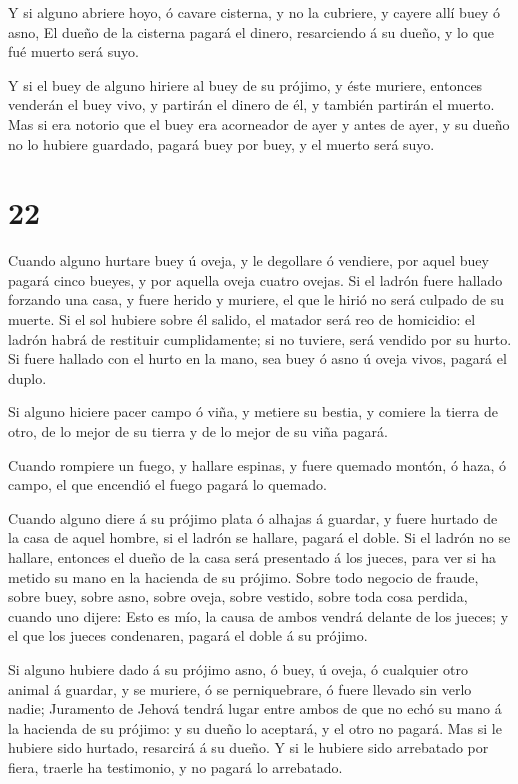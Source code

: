  Y si alguno abriere hoyo, ó cavare cisterna, y no la
cubriere, y cayere allí buey ó asno,  El dueño de la
cisterna pagará el dinero, resarciendo á su dueño, y lo que fué muerto
será suyo.

 Y si el buey de alguno hiriere al buey de su prójimo, y
éste muriere, entonces venderán el buey vivo, y partirán el dinero de
él, y también partirán el muerto.  Mas si era notorio que
el buey era acorneador de ayer y antes de ayer, y su dueño no lo hubiere
guardado, pagará buey por buey, y el muerto será suyo.

\hypertarget{section-21}{%
\section{22}\label{section-21}}

 Cuando alguno hurtare buey ú oveja, y le degollare ó
vendiere, por aquel buey pagará cinco bueyes, y por aquella oveja cuatro
ovejas.  Si el ladrón fuere hallado forzando una casa, y
fuere herido y muriere, el que le hirió no será culpado de su muerte.
 Si el sol hubiere sobre él salido, el matador será reo de
homicidio: el ladrón habrá de restituir cumplidamente; si no tuviere,
será vendido por su hurto.  Si fuere hallado con el hurto en
la mano, sea buey ó asno ú oveja vivos, pagará el duplo.

 Si alguno hiciere pacer campo ó viña, y metiere su bestia,
y comiere la tierra de otro, de lo mejor de su tierra y de lo mejor de
su viña pagará.

 Cuando rompiere un fuego, y hallare espinas, y fuere
quemado montón, ó haza, ó campo, el que encendió el fuego pagará lo
quemado.

 Cuando alguno diere á su prójimo plata ó alhajas á guardar,
y fuere hurtado de la casa de aquel hombre, si el ladrón se hallare,
pagará el doble.  Si el ladrón no se hallare, entonces el
dueño de la casa será presentado á los jueces, para ver si ha metido su
mano en la hacienda de su prójimo.  Sobre todo negocio de
fraude, sobre buey, sobre asno, sobre oveja, sobre vestido, sobre toda
cosa perdida, cuando uno dijere: Esto es mío, la causa de ambos vendrá
delante de los jueces; y el que los jueces condenaren, pagará el doble á
su prójimo.

 Si alguno hubiere dado á su prójimo asno, ó buey, ú oveja,
ó cualquier otro animal á guardar, y se muriere, ó se perniquebrare, ó
fuere llevado sin verlo nadie;  Juramento de Jehová tendrá
lugar entre ambos de que no echó su mano á la hacienda de su prójimo: y
su dueño lo aceptará, y el otro no pagará.  Mas si le
hubiere sido hurtado, resarcirá á su dueño.  Y si le
hubiere sido arrebatado por fiera, traerle ha testimonio, y no pagará lo
arrebatado.

